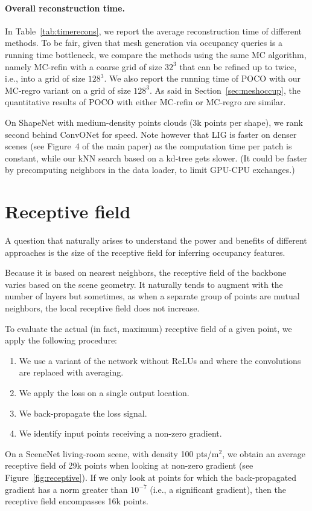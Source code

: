\documentclass[10pt,twocolumn,letterpaper]{article}
\newcommand\OURS{{POCO}}
\begin{document}
\paragraph{Overall reconstruction time.} 
In Table~\ref{tab:timerecons}, we report the average reconstruction time of different methods.
To be fair, given that mesh generation via occupancy queries is a running time bottleneck, we compare the methods using the same MC algorithm, namely MC-refin with a coarse grid of size $32^3$ that can be refined up to twice, i.e., into a grid of size $128^3$. We also report the running time of {\OURS} with our MC-regro variant on a grid of size $128^3$.
As said in Section~\ref{sec:meshoccup}, the quantitative results of {\OURS} with either MC-refin or MC-regro are similar.

On ShapeNet with medium-density points clouds (3k points per shape), we rank second behind ConvONet for speed.
Note however that LIG is faster on denser scenes (see Figure~4 of the main paper) as the computation time per patch is constant, while our kNN search based on a kd-tree gets slower. 
(It could be faster by pre\-com\-put\-ing neighbors in the data loader, to limit GPU-CPU exchanges.)


\section{Receptive field}

A question that naturally arises to understand the power and benefits of different approaches is the size of the receptive field for inferring occupancy features.

Because it is based on nearest neighbors, the receptive field of the backbone varies based on the scene geometry. It naturally tends to augment with the number of layers but sometimes, as when a separate group of points are mutual neighbors, the local receptive field does not increase.

To evaluate the actual (in fact, maximum) receptive field of a given point, we apply the following procedure:
\begin{enumerate}[topsep=1pt,itemsep=-2pt]
    \item We use a variant of the network without ReLUs and where the convolutions are replaced with averaging.
    \item We apply the loss on a single output location.
    \item We back-propagate the loss signal.
    \item We identify input points receiving a non-zero gradient.
\end{enumerate}
On a SceneNet living-room scene, with density 100 pts/m$^2$, we obtain an average receptive field of 29k points when looking at non-zero gradient (see Figure~\ref{fig:receptive}).
If we only look at points for which the back-propagated gradient has a norm greater than $10^{-7}$ (i.e., a significant gradient), then the receptive field encompasses 16k points.
\end{document}
